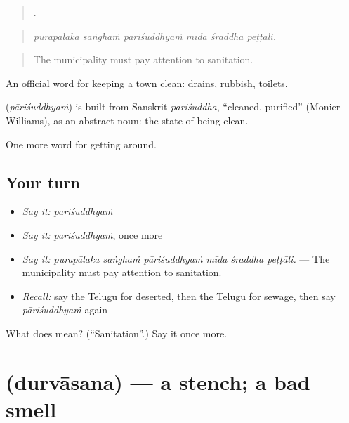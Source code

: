 \begin{quote}
     .
\end{quote}

\begin{quote}
\emph{purapālaka saṅghaṁ pāriśuddhyaṁ mīda śraddha peṭṭāli.}
\end{quote}

\begin{quote}
The municipality must pay attention to sanitation.
\end{quote}

An official word for keeping a town clean: drains, rubbish, toilets.

\begin{cousinweb}
\textbf{} (\emph{pāriśuddhyaṁ}) is built from Sanskrit \emph{pariśuddha}, \textquotedblleft{}cleaned, purified\textquotedblright{} (Monier-Williams), as an abstract noun: the state of being clean.
\end{cousinweb}

\begin{grammarlens}[title={What you've built}]
One more word for getting around.
\end{grammarlens}

\subsection*{Your turn}
\begin{itemize}
\raggedright
  \item \emph{Say it:} \emph{pāriśuddhyaṁ}
  \item \emph{Say it:} \emph{pāriśuddhyaṁ}, once more
  \item \emph{Say it:} \emph{purapālaka saṅghaṁ pāriśuddhyaṁ mīda śraddha peṭṭāli.} — The municipality must pay attention to sanitation.
  \item \emph{Recall:} say the Telugu for deserted, then the Telugu for sewage, then say \emph{pāriśuddhyaṁ} again
\end{itemize}

\begin{tcolorbox}[breakable,colback=teal!4,colframe=teal!35!black,title={Before you move on}]
What does  mean? (\textquotedblleft{}Sanitation\textquotedblright{}.) Say it once more.
\end{tcolorbox}
\section[\texorpdfstring{\te{దుర్వాసన} (durvāsana)}{దుర్వాసన (durvāsana)}]{ (durvāsana) — a stench; a bad smell}

